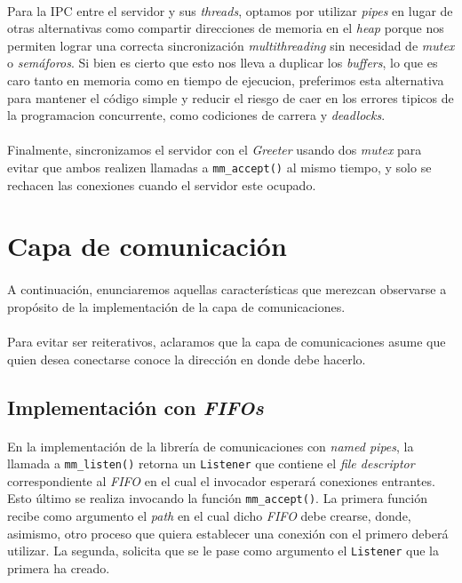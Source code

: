 \documentclass[spanish]{article}
\begin{document}
\paragraph{} Para la IPC entre el servidor y sus \textit{threads}, optamos por utilizar \textit{pipes} en lugar de otras alternativas como compartir direcciones de memoria en el \textit{heap} porque nos permiten lograr una correcta sincronización \textit{multithreading} sin necesidad de \textit{mutex} o \textit{semáforos}. Si bien es cierto que esto nos lleva a duplicar los \textit{buffers}, lo que es caro tanto en memoria como en tiempo de ejecucion, preferimos esta alternativa para mantener el código simple y reducir el riesgo de caer en los errores tipicos de la programacion concurrente, como codiciones de carrera y \textit{deadlocks}.

\paragraph{} Finalmente, sincronizamos el servidor con el \textit{Greeter} usando dos \textit{mutex} para evitar que ambos realizen llamadas a \verb|mm_accept()| al mismo tiempo, y solo se rechacen las conexiones cuando el servidor este ocupado.
\section{Capa de comunicación}
\paragraph{} A continuación, enunciaremos aquellas características que merezcan observarse a propósito de la implementación de la capa de comunicaciones.
\paragraph{} Para evitar ser reiterativos, aclaramos que la capa de comunicaciones asume que quien desea conectarse conoce la dirección en donde debe hacerlo.
\subsection{Implementación con \textit{FIFOs}}
\paragraph{} En la implementación de la librería de comunicaciones con \textit{named pipes}, la llamada a \verb|mm_listen()| retorna un \verb|Listener| que contiene el \textit{file descriptor} correspondiente al \textit{FIFO} en el cual el invocador esperará conexiones entrantes. Esto último se realiza invocando la función \verb|mm_accept()|. La primera función recibe como argumento el \textit{path} en el cual dicho \textit{FIFO} debe crearse, donde, asimismo, otro proceso que quiera establecer una conexión con el primero deberá utilizar. La segunda, solicita que se le pase como argumento el \verb|Listener| que la primera ha creado.
\end{document}
